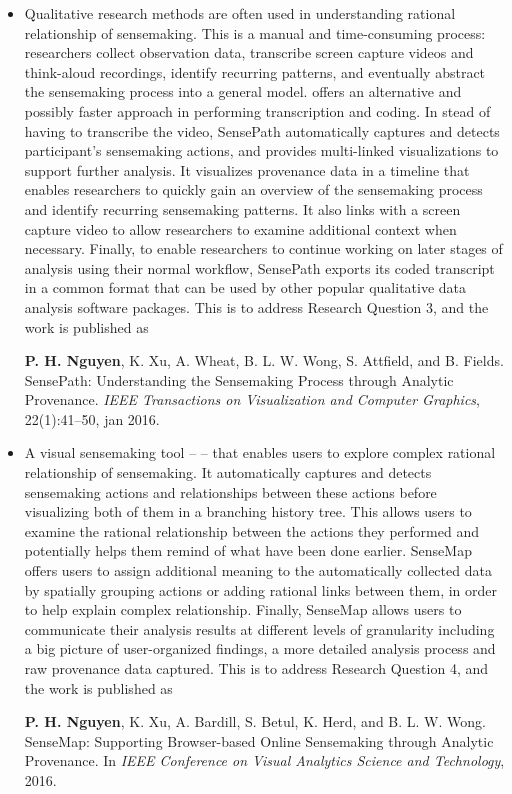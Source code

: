 \begin{itemize}
	\item {}Qualitative research methods are often used in understanding rational relationship of sensemaking. This is a manual and time-consuming process: researchers collect observation data, transcribe screen capture videos and think-aloud recordings, identify recurring patterns, and eventually abstract the sensemaking process into a general model.  offers an alternative and possibly faster approach in performing transcription and coding. In stead of having to transcribe the video, SensePath automatically captures and detects participant's sensemaking actions, and provides multi-linked visualizations to support further analysis. It visualizes provenance data in a timeline that enables researchers to quickly gain an overview of the sensemaking process and identify recurring sensemaking patterns. It also links with a screen capture video to allow researchers to examine  additional context when necessary. Finally, to enable researchers to continue working on later stages of analysis using their normal workflow, SensePath exports its coded transcript in a common format that can be used by other popular qualitative data analysis software packages. This is to address Research Question 3, and the work is published as
	
	\textbf{P. H. Nguyen}, K. Xu, A. Wheat, B. L. W. Wong, S. Attfield, and B. Fields. SensePath: Understanding the Sensemaking Process through Analytic Provenance. \textit{IEEE Transactions on Visualization and Computer Graphics}, 22(1):41--50, jan 2016. 
	
	\item A visual sensemaking tool -- \emph{} -- that enables users to explore complex rational relationship of sensemaking. It automatically captures and detects sensemaking actions and relationships between these actions before visualizing both of them in a branching history tree. This allows users to examine the rational relationship between the actions they performed and potentially helps them remind of what have been done earlier. SenseMap offers users to assign additional meaning to the automatically collected data by spatially grouping actions or adding rational links between them, in order to help explain complex relationship. Finally, SenseMap allows users to communicate their analysis results at different levels of granularity including a big picture of user-organized findings, a more detailed analysis process and raw provenance data captured. This is to address Research Question 4, and the work is published as 

	\textbf{P. H. Nguyen}, K. Xu, A. Bardill, S. Betul, K. Herd, and B. L. W. Wong. SenseMap: Supporting Browser-based Online Sensemaking through Analytic Provenance. In \textit{IEEE Conference on Visual Analytics Science and Technology}, 2016.
\end{itemize}

